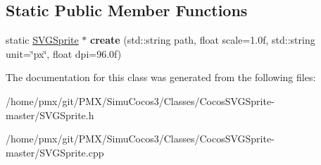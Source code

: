 \subsection*{Static Public Member Functions}
\begin{DoxyCompactItemize}
\item 
\mbox{\label{classSVGSprite_ace32b465a9cae6c4372dd2ed75894f7a}} 
static \hyperlink{classSVGSprite}{S\+V\+G\+Sprite} $\ast$ {\bfseries create} (std\+::string path, float scale=1.\+0f, std\+::string unit=\char`\"{}px\char`\"{}, float dpi=96.\+0f)
\end{DoxyCompactItemize}


The documentation for this class was generated from the following files\+:\begin{DoxyCompactItemize}
\item 
/home/pmx/git/\+P\+M\+X/\+Simu\+Cocos3/\+Classes/\+Cocos\+S\+V\+G\+Sprite-\/master/S\+V\+G\+Sprite.\+h\item 
/home/pmx/git/\+P\+M\+X/\+Simu\+Cocos3/\+Classes/\+Cocos\+S\+V\+G\+Sprite-\/master/S\+V\+G\+Sprite.\+cpp\end{DoxyCompactItemize}
